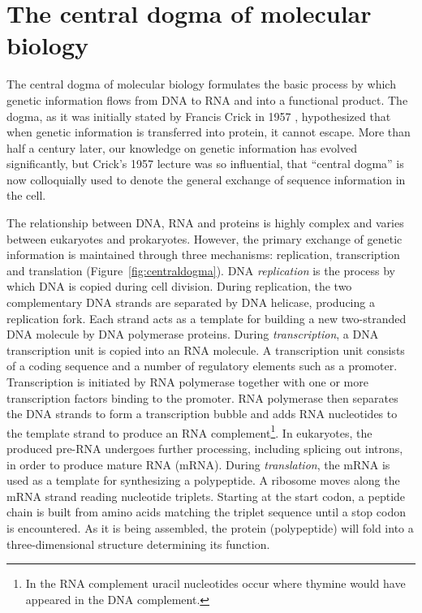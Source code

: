 \section{The central dogma of molecular biology}
The central dogma of molecular biology formulates the basic process by which genetic information flows from DNA to RNA and into a functional product. The dogma, as it was initially stated by Francis Crick in 1957 \cite{Cobb2017}, hypothesized that when genetic information is transferred into protein, it cannot escape. More than half a century later, our knowledge on genetic information has evolved significantly, but Crick's 1957 lecture was so influential, that \enquote{central dogma} is now colloquially used to denote the general exchange of sequence information in the cell.

The relationship between DNA, RNA and proteins is highly complex and varies between eukaryotes and prokaryotes. However, the primary exchange of genetic information is maintained through three mechanisms: replication, transcription and translation (Figure~\ref{fig:centraldogma}).
DNA \emph{replication} is the process by which DNA is copied during cell division. During replication, the two complementary DNA strands are separated by DNA helicase, producing a replication fork. Each strand acts as a template for building a new two-stranded DNA molecule by DNA polymerase proteins.
During \emph{transcription}, a DNA transcription unit is copied into an RNA molecule. A transcription unit consists of a coding sequence and a number of regulatory elements such as a promoter. Transcription is initiated by RNA polymerase together with one or more transcription factors binding to the promoter. RNA polymerase then separates the DNA strands to form a transcription bubble and adds RNA nucleotides to the template strand to produce an RNA complement\footnote{In the RNA complement uracil nucleotides occur where thymine would have appeared in the DNA complement.}. In eukaryotes, the produced pre-RNA undergoes further processing, including splicing out introns, in order to produce mature RNA (mRNA).
During \emph{translation}, the mRNA is used as a template for synthesizing a polypeptide. A ribosome moves along the mRNA strand reading nucleotide triplets. Starting at the start codon, a peptide chain is built from amino acids matching the triplet sequence until a stop codon is encountered. As it is being assembled, the protein (polypeptide) will fold into a three-dimensional structure determining its function.
%
